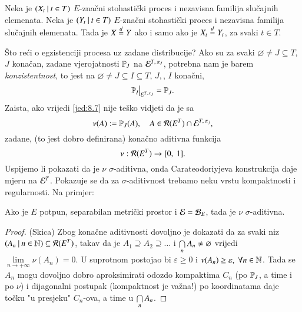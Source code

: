 \begin{kor} \label{kor:8.6}
    Neka je $({X_t} \: | \: {t \in T})$ $E$-zna\v cni stohasti\v cki proces i nezavisna familija slu\v cajnih elemenata.
    Neka je $({Y_t} \: | \: {t \in T})$ $E$-zna\v cni stohasti\v cki proces i nezavisna familija slu\v cajnih elemenata.
    Tada je $X \overset{d}{=} Y$ ako i samo ako je $X_t \overset{d}{=} Y_t$, za svaki $t \in T$.
\end{kor}

\v Sto re\' ci o egzistenciji procesa uz zadane distribucije?
Ako su za svaki $\varnothing \neq J \subseteq T$, $J$ kona\v can, zadane vjerojatnosti $\mathbb{P}_J$ na $\mathcal{E}^{T, \: \pi_J}$, potrebna nam je barem \emph{konzistentnost}, to jest na $\varnothing \neq J \subseteq  I \subseteq T$, $J,$, $I$ kona\v cni,
\begin{equation}    \label{jed:8.7}
    \restr{\masP_I}{\famE^{T, \: \pi_J}} = \masP_J.
\end{equation}
Zaista, ako vrijedi \eqref{jed:8.7} nije te\v sko vidjeti da je sa
\begin{equation*}
    \nu (A) := \mathbb{P}_J (A), \quad A \in \mathcal{R}({E^T}) \cap \mathcal{E}^{T, \: \pi_j},
\end{equation*}
zadane, (to jest dobro definirana) kona\v cno aditivna funkcija
\begin{equation*}
    \nu : \mathcal{R}({E^T}) \to [{0}, \:{1}].
\end{equation*}
Uspijemo li pokazati da je $\nu$ $\sigma$-aditivna, onda Carateodoriyjeva konstrukcija daje mjeru na $\mathcal{E}^T$.
Pokazuje se da za $\sigma$-aditivnost trebamo neku vrstu kompaktnosti i regularnosti.
Na primjer:

\begin{lm}  \label{lm:8.6}
    Ako je $E$ potpun, separabilan metri\v cki prostor i $\mathcal{E} = \mathcal{B}_{E}$, tada je $\nu$ $\sigma$-aditivna.
\end{lm}

\begin{proof}{(Skica)}
    Zbog kona\v cne aditivnosti dovoljno je dokazati da za svaki niz $({A_n} \: | \: {n \in \mathbb{N}}) \subseteq \mathcal{R}({E^T})$, takav da je
    $A_1 \supseteq A_2 \supseteq \ldots$ i $\bigcap\limits_{n}^{} A_n \neq \varnothing$ vrijedi $\lim\limits_{n \to +\infty} \nu (A_n) = 0$.
    U suprotnom postojao bi $\varepsilon \geq 0$ i $\nu (A_n) \geq \varepsilon, \; \forall n \in \mathbb{N}$.
    Tada se $A_n$ mogu dovoljno dobro aproksimirati odozdo kompaktima $C_n$ (po $\mathbb{P}_J$, a time i po $\nu$) i dijagonalni postupak (kompaktnost je va\v zna!) po koordinatama daje to\v cku "u presjeku" $C_n$-ova, a time u $\bigcap\limits_{n}^{} A_n$.
\end{proof}

